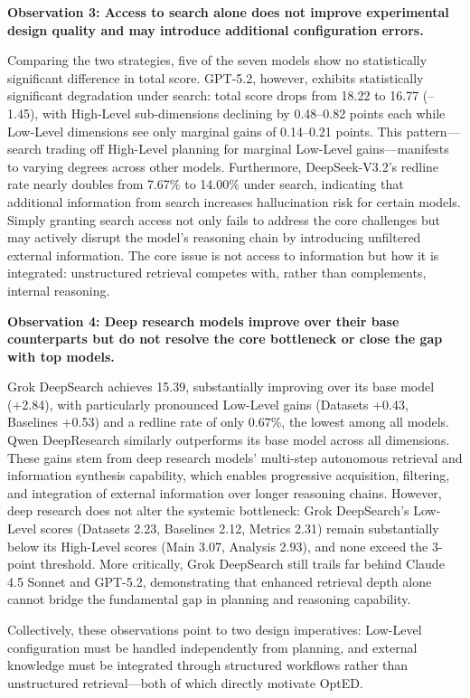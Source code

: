 \documentclass[letterpaper]{article} %
\begin{document}
\textbf{Observation 3: Access to search alone does not improve experimental design quality and may introduce additional configuration errors.} 

Comparing the two strategies, five of the seven models show no statistically significant difference in
total score. GPT-5.2, however, exhibits statistically significant degradation under search:
total score drops from 18.22 to 16.77 (--1.45), with High-Level sub-dimensions declining by 0.48--0.82 points each while Low-Level dimensions see only marginal gains of 0.14--0.21 points.
This pattern---search trading off High-Level planning for marginal Low-Level gains---manifests to varying degrees across other models.
Furthermore, DeepSeek-V3.2's redline rate nearly doubles from 7.67\% to 14.00\% under search, indicating that additional information from search increases hallucination risk for certain models.
Simply granting search access not only fails to address the core challenges but may actively disrupt the model's reasoning chain by introducing unfiltered external information. The core issue is not access to information but how it is integrated: unstructured retrieval competes with, rather than complements, internal reasoning.

\textbf{Observation 4: Deep research models improve over their base counterparts but do not resolve the core bottleneck or close the gap with top models.} 

Grok DeepSearch achieves 15.39, substantially improving over its base model (+2.84), with particularly pronounced Low-Level gains (Datasets +0.43, Baselines +0.53) and a redline rate of only 0.67\%, the lowest among all models. 
Qwen DeepResearch similarly outperforms its base model across all dimensions. These gains stem from deep research models' 
multi-step autonomous retrieval and information synthesis capability, which enables progressive acquisition, filtering, and 
integration of external information over longer reasoning chains. However, deep research does not alter the systemic bottleneck: 
Grok DeepSearch's Low-Level scores (Datasets 2.23, Baselines 2.12, Metrics 2.31) remain substantially below its High-Level scores 
(Main 3.07, Analysis 2.93), and none exceed the 3-point threshold. More critically, Grok DeepSearch still trails far behind 
Claude 4.5 Sonnet and GPT-5.2, demonstrating that enhanced retrieval depth alone cannot bridge the fundamental gap in planning 
and reasoning capability.

Collectively, these observations point to two design imperatives: Low-Level configuration must be handled independently from planning, and external knowledge must be integrated through structured workflows rather than unstructured retrieval---both of which directly motivate OptED.
\end{document}
